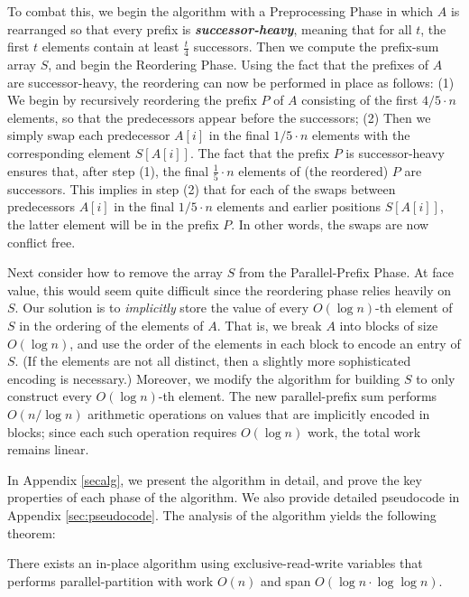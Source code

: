 \documentclass[twoside,leqno,twocolumn]{article}
\newcommand{\defn}[1]{{\textit{\textbf{\boldmath #1}}}}
\begin{document}
To combat this, we begin the algorithm with a Preprocessing Phase in
which $A$ is rearranged so that every prefix is
\defn{successor-heavy}, meaning that for all $t$, the first $t$
elements contain at least $\frac{t}{4}$ successors. Then we compute
the prefix-sum array $S$, and begin the Reordering Phase. Using the
fact that the prefixes of $A$ are successor-heavy, the reordering can
now be performed in place as follows: (1) We begin by recursively
reordering the prefix $P$ of $A$ consisting of the first $4/5 \cdot n$
elements, so that the predecessors appear before the successors; (2)
Then we simply swap each predecessor $A[i]$ in the final $1/5 \cdot n$
elements with the corresponding element $S[A[i]]$. The fact that the
prefix $P$ is successor-heavy ensures that, after step (1), the final 
$\frac{1}{5} \cdot n$ elements of (the reordered) $P$ are successors. 
This implies in step (2) that for each of the swaps between predecessors $A[i]$
in the final $1/5 \cdot n$ elements and earlier positions $S[A[i]]$, the latter
element will be in the prefix $P$. In other words, the swaps are now conflict
free.

Next consider how to remove the array $S$ from the Parallel-Prefix
Phase. At face value, this would seem quite difficult since the
reordering phase relies heavily on $S$. Our solution is to
\emph{implicitly} store the value of every $O(\log n)$-th element of
$S$ in the ordering of the elements of $A$. That is, we break $A$ into
blocks of size $O(\log n)$, and use the order of the elements in each
block to encode an entry of $S$. (If the elements are not all
  distinct, then a slightly more sophisticated encoding is necessary.)
Moreover, we modify the algorithm for building $S$ to only construct
every $O(\log n)$-th element. The new parallel-prefix sum performs
$O(n / \log n)$ arithmetic operations on values that are implicitly
encoded in blocks; since each such operation requires $O(\log n)$
work, the total work remains linear.

In Appendix \ref{secalg}, we present the algorithm in detail,
and prove the key properties of each phase of the algorithm. We also
provide detailed pseudocode in Appendix \ref{sec:pseudocode}. 
The analysis of the algorithm yields the following theorem:
\begin{theorem}
  \label{thm:inplacesec}
  There exists an in-place algorithm using exclusive-read-write
  variables that performs parallel-partition with work $O(n)$ and span
  $O(\log n \cdot \log \log n)$.
\end{theorem}
\end{document}
